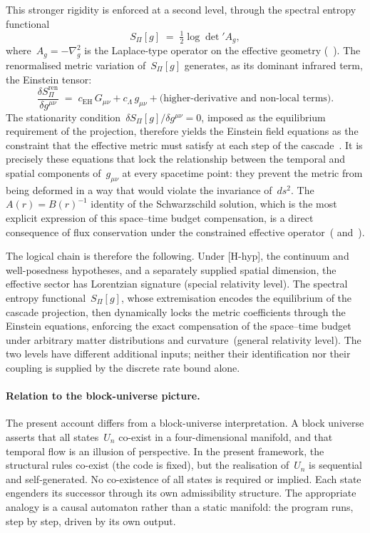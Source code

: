     This stronger rigidity is enforced at a second level, through the spectral entropy
    functional
    \begin{equation}
      S_\Pi[g] \;=\; \tfrac{1}{2}\log\det' A_g,
    \end{equation}
    where~$A_g = -\nabla_g^2$ is the Laplace-type operator on the effective geometry
    (~\cite[Sec.~2, Sec.~4]{Beau2026h}).
    The renormalised metric variation of~$S_\Pi[g]$ generates, as its dominant infrared
    term, the Einstein tensor:
    \begin{equation}
      \frac{\delta S_\Pi^{\mathrm{ren}}}{\delta g^{\mu\nu}}
      \;=\; c_{\mathrm{EH}}\,G_{\mu\nu}
      + c_\Lambda\,g_{\mu\nu}
      + \text{(higher-derivative and non-local terms)}.
    \end{equation}
    The stationarity condition~$\delta S_\Pi[g]/\delta g^{\mu\nu} = 0$, imposed as the
    equilibrium requirement of the projection, therefore yields the Einstein field
    equations as the constraint that the effective metric must satisfy at each step of
    the cascade~\cite{Beau2026h, Beau2026i}.
    It is precisely these equations that lock the relationship between the temporal and
    spatial components of~$g_{\mu\nu}$ at every spacetime point: they prevent the metric
    from being deformed in a way that would violate the invariance of~$ds^2$.
    The~$A(r) = B(r)^{-1}$ identity of the Schwarzschild solution, which is the most
    explicit expression of this space--time budget compensation, is a direct consequence
    of flux conservation under the constrained effective operator~(\cite{Beau2026c}
    and~\cite[Sec.~5.3, 6]{Beau2026h}).

    The logical chain is therefore the following.
    Under [H-hyp], the continuum and well-posedness hypotheses, and a separately supplied spatial
    dimension, the effective sector has Lorentzian signature (special relativity level).
    The spectral entropy functional~$S_\Pi[g]$, whose extremisation encodes the
    equilibrium of the cascade projection, then dynamically locks the metric coefficients
    through the Einstein equations, enforcing the exact compensation of the space--time
    budget under arbitrary matter distributions and curvature~(general relativity level).
    The two levels have different additional inputs; neither their identification nor their coupling
    is supplied by the discrete rate bound alone.

  \paragraph{Relation to the block-universe picture.}
    The present account differs from a block-universe interpretation.
    A block universe asserts that all states~$U_n$ co-exist in a four-dimensional
    manifold, and that temporal flow is an illusion of perspective.
    In the present framework, the structural rules co-exist (the code is fixed),
    but the realisation of~$U_n$ is sequential and self-generated.
    No co-existence of all states is required or implied.
    Each state engenders its successor through its own admissibility structure.
    The appropriate analogy is a causal automaton rather than a static manifold:
    the program runs, step by step, driven by its own output.

